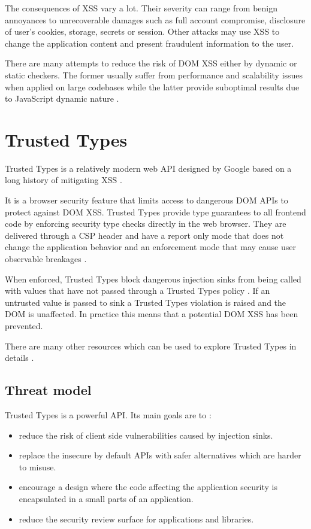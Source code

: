 The consequences of XSS vary a lot. Their severity can range from benign annoyances to unrecoverable
damages such as full account compromise, disclosure of user's cookies, storage, secrets or session.
Other attacks may use XSS to change the application content and present fraudulent information to
the user.

There are many attempts to reduce the risk of DOM XSS either by dynamic or static checkers. The
former usually suffer from performance and scalability issues when applied on large codebases while
the latter provide suboptimal results due to JavaScript dynamic nature
\cite{tt_web_framework_paper} \cite{owasp_xss_cheatsheet}.

\section{Trusted Types}

Trusted Types is a relatively modern web API designed by Google based on a long history of
mitigating XSS \cite{tt_design_history}.

It is a browser security feature that limits access to dangerous DOM APIs to protect against DOM
XSS. Trusted Types provide type guarantees to all frontend code by enforcing security type checks
directly in the web browser. They are delivered through a CSP header and have a report only mode
that does not change the application behavior and an enforcement mode that may cause user observable
breakages \cite{tt_background}.

When enforced, Trusted Types block dangerous injection sinks from being called with values that have
not passed through a Trusted Types policy \cite{tt_background}. If an untrusted value is passed to
sink a Trusted Types violation is raised and the DOM is unaffected. In practice this means that a
potential DOM XSS has been prevented.

There are many other resources which can be used to explore Trusted Types in details
\cite{tt_resources}.

\subsection{Threat model}

Trusted Types is a powerful API. Its main goals are to \cite{tt_spec:goals}:

\begin{itemize}
  \item reduce the risk of client side vulnerabilities caused by injection sinks.
  \item replace the insecure by default APIs with safer alternatives which are harder to misuse.
  \item encourage a design where the code affecting the application security is encapsulated in a
        small parts of an application.
  \item reduce the security review surface for applications and libraries.
\end{itemize}

